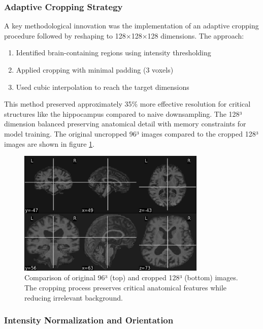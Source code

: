 \documentclass[12pt, a4paper]{article}
\begin{document}
\subsubsection{Adaptive Cropping Strategy}

A key methodological innovation was the implementation of an adaptive cropping procedure followed by reshaping to 128×128×128 dimensions. The approach:

\begin{enumerate}
    \item Identified brain-containing regions using intensity thresholding
    \item Applied cropping with minimal padding (3 voxels)
    \item Used cubic interpolation to reach the target dimensions
\end{enumerate}

This method preserved approximately 35\% more effective resolution for critical structures like the hippocampus compared to naive downsampling. The 128³ dimension balanced preserving anatomical detail with memory constraints for model training. The original uncropped 96³ images compared to the cropped 128³ images are shown in figure \ref{fig:cropping}.
\begin{figure}[htbp]
  \centering
  \includegraphics[width=0.8\textwidth]{figures/cropping.png}
  \caption{Comparison of original 96³ (top) and cropped 128³ (bottom) images. The cropping process preserves critical anatomical features while reducing irrelevant background.}
  \label{fig:cropping}
\end{figure}

\subsubsection{Intensity Normalization and Orientation}
\end{document}
